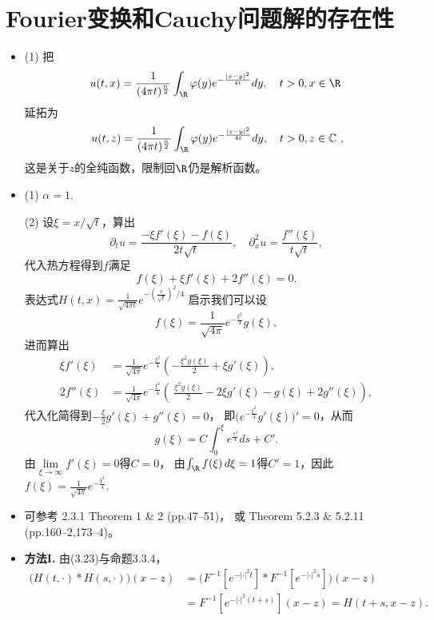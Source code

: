 \section{Fourier变换和Cauchy问题解的存在性}
\begin{itemize}
\item[5.]
(1) 把$$\!u(t,x)=\frac{1}{(4\pi t)^\frac{n}{2}}\int_{\R}\varphi(y)e^{-\frac{|x-y|^2}{4t}}dy,\quad t>0,x\in\R$$延拓为
$$\,u(t,z)=\frac{1}{(4\pi t)^\frac{n}{2}}\int_{\R}\varphi(y)e^{-\frac{|z-y|^2}{4t}}dy,\quad t>0,z\in\mathbb{C}\ ,$$
这是关于$z$的全纯函数，限制回$\R$仍是解析函数。

\item[6.]
(1) $\alpha=1$.

(2) 设$\xi=x/\sqrt{t}$，算出
\[\partial_tu=\frac{-\xi f'(\xi)-f(\xi)}{2t\sqrt{t}},
\quad\partial_x^2u=\frac{f''(\xi)}{t\sqrt{t}},\]
代入热方程得到$f$满足
\[f(\xi)+\xi f'(\xi)+2f''(\xi)=0.\]
表达式$H(t,x)=\frac{1}{\sqrt{4\pi t}}e^{-\left(\frac{x}{\sqrt{t}}\right)^2/4}$
启示我们可以设
\[f(\xi)=\frac{1}{\sqrt{4\pi}}e^{-\frac{\xi^2}{4}}g(\xi),\]
进而算出
\begin{align*}
    \xi f'(\xi)&=\frac{1}{\sqrt{4\pi}}e^{-\frac{\xi^2}{4}}\left(-\frac{\xi^2g(\xi)}{2}+\xi g'(\xi)\right),\\
    2f''(\xi)&=\frac{1}{\sqrt{4\pi}}e^{-\frac{\xi^2}{4}}\left(\ \frac{\xi^2g(\xi)}{2}-2\xi g'(\xi)-g(\xi)+2g''(\xi)\right),
\end{align*}
代入化简得到$-\frac{\xi}{2}g'(\xi)+g''(\xi)=0$，
即$\big(e^{-\frac{\xi^2}{4}}g'(\xi)\big)'=0$，从而
\[g(\xi)=C\int_0^\xi e^\frac{s^2}{4}ds+C'.\]
由$\lim\limits_{\xi\rightarrow\infty}f'(\xi)=0$得$C=0$，
由$\int_\R f(\xi)\,d\xi=1$得$C'=1$，因此$f(\xi)=\frac{1}{\sqrt{4\pi}}e^{-\frac{\xi^2}{4}}$.

\item[7.] 可参考\cite{Evans} 2.3.1 Theorem 1 \& 2 (pp.47--51)，
或\cite{Han} Theorem 5.2.3 \& 5.2.11 (pp.160--2,173--4)。

\item[8.] \textbf{方法I.} 由(3.23)与命题3.3.4，
\begin{align*}
    \big(H(t,\cdot)*H(s,\cdot)\big)(x-z)
    &=\big(F^{-1}[e^{-|\cdot|^2t}]*F^{-1}[e^{-|\cdot|^2s}]\big)(x-z)\\
    &=F^{-1}[e^{-|\cdot|^2(t+s)}](x-z)=H(t+s,x-z).
\end{align*}


\end{itemize}
